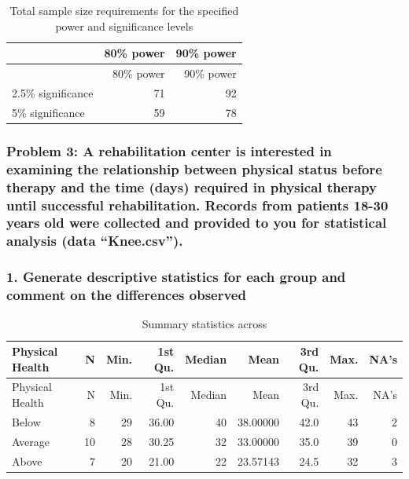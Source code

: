 \documentclass[]{article}
\begin{document}
\begin{longtable}[]{@{}lrr@{}}
\caption{Total sample size requirements for the specified power and
significance levels}\tabularnewline
\toprule
& 80\% power & 90\% power\tabularnewline
\midrule
\endfirsthead
\toprule
& 80\% power & 90\% power\tabularnewline
\midrule
\endhead
2.5\% significance & 71 & 92\tabularnewline
5\% significance & 59 & 78\tabularnewline
\bottomrule
\end{longtable}

\newpage 

\subsubsection{\texorpdfstring{Problem 3: A rehabilitation center is
interested in examining the relationship between physical status before
therapy and the time (days) required in physical therapy until
successful rehabilitation. Records from patients 18-30 years old were
collected and provided to you for statistical analysis (data
``Knee.csv'').}{Problem 3: A rehabilitation center is interested in examining the relationship between physical status before therapy and the time (days) required in physical therapy until successful rehabilitation. Records from patients 18-30 years old were collected and provided to you for statistical analysis (data Knee.csv).}}\label{problem-3-a-rehabilitation-center-is-interested-in-examining-the-relationship-between-physical-status-before-therapy-and-the-time-days-required-in-physical-therapy-until-successful-rehabilitation.-records-from-patients-18-30-years-old-were-collected-and-provided-to-you-for-statistical-analysis-data-knee.csv.}

\subsubsection{1. Generate descriptive statistics for each group and
comment on the differences
observed}\label{generate-descriptive-statistics-for-each-group-and-comment-on-the-differences-observed}

\begin{longtable}[]{@{}lrrrrrrrr@{}}
\caption{Summary statistics across}\tabularnewline
\toprule
Physical Health & N & Min. & 1st Qu. & Median & Mean & 3rd Qu. & Max. &
NA's\tabularnewline
\midrule
\endfirsthead
\toprule
Physical Health & N & Min. & 1st Qu. & Median & Mean & 3rd Qu. & Max. &
NA's\tabularnewline
\midrule
\endhead
Below & 8 & 29 & 36.00 & 40 & 38.00000 & 42.0 & 43 & 2\tabularnewline
Average & 10 & 28 & 30.25 & 32 & 33.00000 & 35.0 & 39 & 0\tabularnewline
Above & 7 & 20 & 21.00 & 22 & 23.57143 & 24.5 & 32 & 3\tabularnewline
\bottomrule
\end{longtable}
\end{document}
